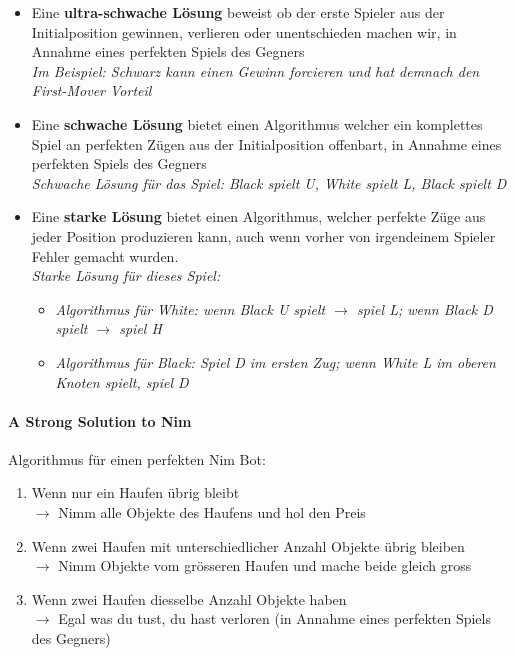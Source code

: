 \documentclass[a4paper]{article}
\begin{document}
		\begin{itemize}
			\item Eine \textbf{ultra-schwache Lösung} beweist ob der erste Spieler aus der Initialposition gewinnen, verlieren oder unentschieden machen wir, in Annahme eines perfekten Spiels des Gegners \\
			\textit{Im Beispiel: Schwarz kann einen Gewinn forcieren und hat demnach den First-Mover Vorteil}
			
			\item Eine \textbf{schwache Lösung} bietet einen Algorithmus welcher ein komplettes Spiel an perfekten Zügen aus der Initialposition offenbart, in Annahme eines perfekten Spiels des Gegners \\
			\textit{Schwache Lösung für das Spiel: Black spielt U, White spielt L, Black spielt D}
			
			\item Eine \textbf{starke Lösung} bietet einen Algorithmus, welcher perfekte Züge aus jeder Position produzieren kann, auch wenn vorher von irgendeinem Spieler Fehler gemacht wurden. \\
			\textit{Starke Lösung für dieses Spiel:}
				\begin{itemize}
					\item \textit{Algorithmus für White: wenn Black U spielt $\rightarrow$ spiel L; wenn Black D spielt $\rightarrow$ spiel H}
					\item \textit{Algorithmus für Black: Spiel D im ersten Zug; wenn White L im oberen Knoten spielt, spiel D}
				\end{itemize}
		\end{itemize}
	
		\paragraph{A Strong Solution to Nim}
		
		Algorithmus für einen perfekten Nim Bot:
		
		\begin{enumerate}
			\item Wenn nur ein Haufen übrig bleibt \\
				$\rightarrow$ Nimm alle Objekte des Haufens und hol den Preis
			\item Wenn zwei Haufen mit unterschiedlicher Anzahl Objekte übrig bleiben \\
				$\rightarrow$ Nimm Objekte vom grösseren Haufen und mache beide gleich gross
			\item Wenn zwei Haufen diesselbe Anzahl Objekte haben \\
				$\rightarrow$ Egal was du tust, du hast verloren (in Annahme eines perfekten Spiels des Gegners)
		\end{enumerate} 
	
\end{document}
